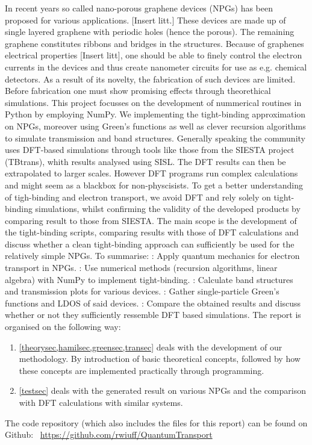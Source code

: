 In recent years so called nano-porous graphene devices (NPGs) has been proposed for various applications. [Insert litt.] These devices are made up of single layered graphene with periodic holes (hence the porous). The remaining graphene constitutes ribbons and bridges in the structures. Because of graphenes electrical properties [Insert litt], one should be able to finely control the electron currents in the devices and thus create nanometer circuits for use as e.g. chemical detectors. As a result of its novelty, the fabrication of such devices are limited. Before fabrication one must show promising effects through theorethical simulations.\newline
This project focusses on the development of nummerical routines in Python by employing NumPy. We implementing the tight-binding approximation on NPGs, moreover using Green's functions as well as clever recursion algorithms to simulate transmission and band structures.\newline
Generally speaking the community uses DFT-based simulations through tools like those from the SIESTA project (TBtrans), whith results analysed using SISL\cite{zerothi_sisl}. The DFT results can then be extrapolated to larger scales\cite{calogero_electron_2019}. However DFT programs run complex calculations and might seem as a blackbox for non-physcisists. To get a better understanding of tigh-binding and electron transport, we avoid DFT and rely solely on tight-binding simulations, whilst confirming the validity of the developed products by comparing result to those from SIESTA.\newline
The main scope is the development of the tight-binding scripts, comparing results with those of DFT calculations and discuss whether a clean tight-binding approach can sufficiently be used for the relatively simple NPGs.\newline
To summarise:\newline
{}: Apply quantum mechanics for electron transport in NPGs. : Use numerical methods (recursion algorithms, linear algebra) with NumPy to implement tight-binding. : Calculate band structures and transmission plots for various devices. : Gather single-particle Green’s functions and LDOS of said devices. : Compare the obtained results and discuss whether or not they sufficiently ressemble DFT based simulations.
The report is organised on the following way:
\begin{enumerate}
    \item \cref{theorysec,hamilsec,greensec,transec} deals with the development of our methodology. By introduction of basic theoretical concepts, followed by how these concepts are implemented practically through programming. 
    \item \cref{testsec} deals with the generated result on various NPGs and the comparison with DFT calculations with similar systems.
\end{enumerate}
The code repository (which also includes the \latex files for this report) can be found on Github: \faGithub \ \url{https://github.com/rwiuff/QuantumTransport}
